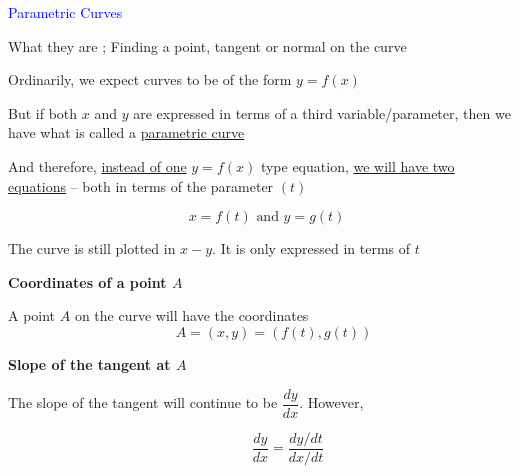 \documentclass[14pt,fleqn]{extarticle}
\begin{document}
\begin{skill}
\textcolor{blue}{Parametric Curves}

What they are ; Finding a point, tangent or normal on the curve

\end{skill}
%

\newcard

Ordinarily, we expect curves to
be of the form $y = f(x)$ \newline 

But if both $x$ and $y$ are expressed
in terms of a third variable/parameter,
then we have what is called a 
\underline{parametric curve}\newline 

And therefore, \underline{instead of one} $y = f(x)$ type equation,
\underline{we will have two equations} -- both in terms 
of the parameter $(t)$

\[ \quad x = f(t)  \text{ and }  y = g(t) \]

The curve is still plotted in $x-y$. It is only expressed in terms of $t$\newline 

 \textbf{Coordinates of a point $A$}\newline 
 
 A point $A$ on the curve will have 
 the coordinates 
 \[ \qquad A = (x,y) = \left(f(t), g(t) \right)\]

\textbf{Slope of the tangent at $A$}\newline
 
 The slope of the tangent will continue
 to be $\dfrac{dy}{dx}$. However, 

 \[ \qquad\qquad \dfrac{dy}{dx} = \frac{dy / dt}{dx / dt}\]
 
%
\end{document}
